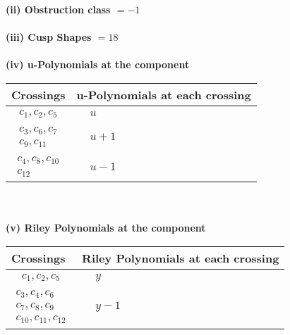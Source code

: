 \documentclass[1p]{elsarticle_modified}
\theoremstyle{definition}
\begin{document}
\flushleft \textbf{(ii) Obstruction class $= -1$}\\~\\
\flushleft \textbf{(iii) Cusp Shapes $= 18$}\\~\\
\newpage\renewcommand{\arraystretch}{1}
\flushleft \textbf{(iv) u-Polynomials at the component}\newline \\
\begin{tabular}{m{50pt}|m{274pt}}
Crossings & \hspace{64pt}u-Polynomials at each crossing \\
\hline $$\begin{aligned}c_{1},c_{2},c_{5}\end{aligned}$$&$\begin{aligned}
&u
\end{aligned}$\\
\hline $$\begin{aligned}c_{3},c_{6},c_{7}\\c_{9},c_{11}\end{aligned}$$&$\begin{aligned}
&u+1
\end{aligned}$\\
\hline $$\begin{aligned}c_{4},c_{8},c_{10}\\c_{12}\end{aligned}$$&$\begin{aligned}
&u-1
\end{aligned}$\\
\hline
\end{tabular}\\~\\
\newpage\renewcommand{\arraystretch}{1}
\flushleft \textbf{(v) Riley Polynomials at the component}\newline \\
\begin{tabular}{m{50pt}|m{274pt}}
Crossings & \hspace{64pt}Riley Polynomials at each crossing \\
\hline $$\begin{aligned}c_{1},c_{2},c_{5}\end{aligned}$$&$\begin{aligned}
&y
\end{aligned}$\\
\hline $$\begin{aligned}c_{3},c_{4},c_{6}\\c_{7},c_{8},c_{9}\\c_{10},c_{11},c_{12}\end{aligned}$$&$\begin{aligned}
&y-1
\end{aligned}$\\
\hline
\end{tabular}\\~\\
\end{document}

